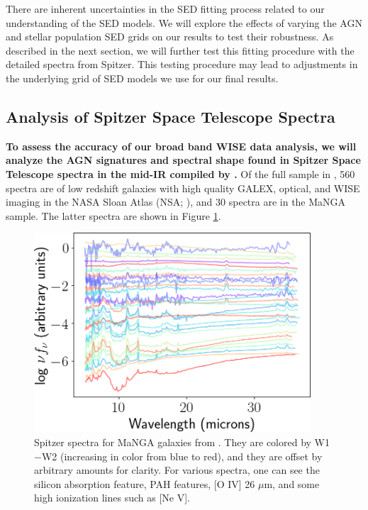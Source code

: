 \documentclass[12pt, preprint]{hacked-aastex}
\begin{document}
There are inherent uncertainties in the SED fitting process related to
our understanding of the SED models. We will explore the effects of
varying the AGN and stellar population SED grids on our results to
test their robustness.  As described in the next section, we will
further test this fitting procedure with the detailed spectra from
Spitzer. This testing procedure may lead to adjustments in the
underlying grid of SED models we use for our final results.


\subsection{Analysis of Spitzer Space Telescope Spectra}
\label{sec:spitzer}

{\bf To assess the accuracy of our broad band WISE data analysis, we
  will analyze the AGN signatures and spectral shape found in Spitzer
  Space Telescope spectra in the mid-IR compiled by
  \cite{lambrides19a}.}  Of the full sample in \cite{lambrides19a},
560 spectra are of low redshift galaxies with high quality GALEX,
optical, and WISE imaging in the NASA Sloan Atlas (NSA;
\cite{blanton11a}), and 30 spectra are in the MaNGA sample.  The
latter spectra are shown in Figure \ref{fig:spitzer}.

\begin{figure}[t!]
\includegraphics[width=0.92\textwidth]{all-spitzer.png}
    \caption{
\label{fig:spitzer} \small Spitzer spectra for MaNGA galaxies
from \cite{lambrides19a}. They are colored by W1$-$W2 (increasing
in color from blue to red), and they are offset by arbitrary
amounts for clarity. For various spectra, one can see 
the silicon absorption  feature, PAH features, [O IV] 26 $\mu$m, 
and some high ionization lines such as [Ne V].
}
\end{figure}
\end{document}
